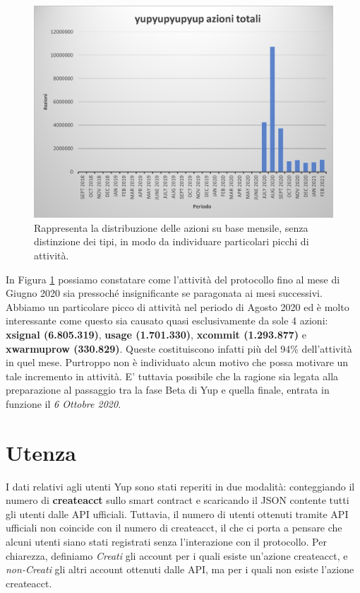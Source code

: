 \begin{figure}[h!]
    \centering
    \includegraphics[width=1\textwidth]{graphs/mensile_azioni.png}
    \caption{Rappresenta la distribuzione delle azioni su base mensile, senza distinzione dei tipi, in modo da individuare particolari picchi di attività.}
    \label{fig:actionsMensile}
\end{figure}

In Figura \ref{fig:actionsMensile} possiamo constatare come l'attività del protocollo fino al mese di Giugno 2020 sia pressoché insignificante se paragonata ai mesi successivi. Abbiamo un particolare picco di attività nel periodo di Agosto 2020 ed è molto interessante come questo sia causato quasi esclusivamente da sole 4 azioni: \textbf{xsignal (6.805.319)}, \textbf{usage (1.701.330)}, \textbf{xcommit (1.293.877)} e \textbf{xwarmuprow (330.829)}. Queste costituiscono infatti più del 94\% dell'attività in quel mese. Purtroppo non è individuato alcun motivo che possa motivare un tale incremento in attività. E' tuttavia possibile che la ragione sia legata alla preparazione al passaggio tra la fase Beta di Yup e quella finale, entrata in funzione il \textit{6 Ottobre 2020}. 

\section{Utenza}
I dati relativi agli utenti Yup sono stati reperiti in due modalità: conteggiando il numero di \textbf{createacct} sullo smart contract e scaricando il JSON contente tutti gli utenti dalle API ufficiali.
Tuttavia, il numero di utenti ottenuti tramite API ufficiali non coincide con il numero di createacct, il che ci porta a pensare che alcuni utenti siano stati registrati senza l'interazione con il protocollo.
Per chiarezza, definiamo \textit{Creati} gli account per i quali esiste un'azione createacct, e \textit{non-Creati} gli altri account ottenuti dalle API, ma per i quali non esiste l'azione createacct.

